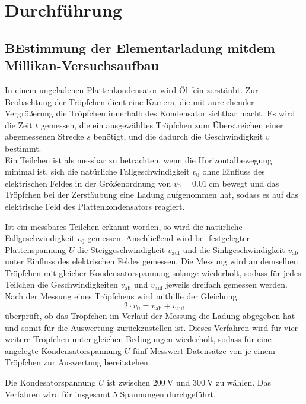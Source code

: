 \section{Durchf\"uhrung}
\label{sec:Durchfuehrung}

\subsection{BEstimmung der Elementarladung mitdem Millikan-Versuchsaufbau}
In einem ungeladenen Plattenkondensator wird Öl fein zerstäubt.
Zur Beobachtung der Tröpfchen dient eine Kamera, die mit aureichender Vergrößerung die Tröpfchen innerhalb des Kondensator sichtbar macht.
Es wird die Zeit $t$ gemessen, die ein ausgewähltes Tröpfchen zum Überstreichen einer abgemessenen Strecke $s$ benötigt, und die dadurch die Geschwindigkeit $v$ bestimmt.\\
Ein Teilchen ist als messbar zu betrachten, wenn die Horizontalbewegung minimal ist, 
sich die natürliche Fallgeschwindigkeit $v_0$ ohne Einfluss des elektrischen Feldes in der Größenordnung von $v_0=\SI{0.01}{\centi\meter}$ bewegt und 
das Tröpfchen bei der Zerstäubung eine Ladung aufgenommen hat, sodass es auf das elektrische Feld des Plattenkondensators reagiert.

Ist ein messbares Teilchen erkannt worden, so wird die natürliche Fallgeschwindigkeit $v_0$ gemessen. 
Anschließend wird bei festgelegter Plattenspannung $U$ die Steiggeschwindigkeit $v_\text{auf}$ und die Sinkgeschwindigkeit $v_\text{ab}$ unter Einfluss des elektrischen Feldes gemessen.
Die Messung wird an demselben Tröpfchen mit gleicher Kondensatorspannung solange wiederholt, sodass für jedes Teilchen die   Geschwindigkeiten $v_\text{ab}$ und $v_\text{auf}$ jeweils dreifach gemessen werden.
Nach der Messung eines Tröpfchens wird mithilfe der Gleichung
\begin{equation}
	2\cdot v_0=v_\text{ab}+v_\text{auf}
	\label{eq:plaus_test}
\end{equation}
überprüft, ob das Tröpfchen im Verlauf der Messung die Ladung abgegeben hat und somit für die Auswertung zurückzustellen ist.
Dieses Verfahren wird für vier weitere Tröpfchen unter gleichen Bedingungen wiederholt, sodass für eine angelegte Kondensatorspannung $U$ fünf Messwert-Datensätze von je einem Tröpfchen zur Auswertung bereitstehen.

Die Kondesatorspannung $U$ ist zwischen $\SI{200}{\volt}$ und $\SI{300}{\volt}$ zu wählen.
Das Verfahren wird für insgesamt 5 Spannungen durchgeführt.

